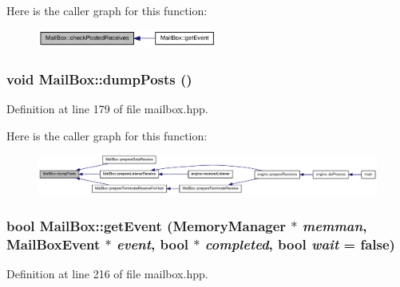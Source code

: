 Here is the caller graph for this function:\nopagebreak
\begin{figure}[H]
\begin{center}
\leavevmode
\includegraphics[width=167pt]{class_mail_box_a0dc7cda2ef943be7763bf18494e9422d_icgraph}
\end{center}
\end{figure}
\hypertarget{class_mail_box_a541c1f871502eec356801ed5657f56c3}{
\subsubsection[{dumpPosts}]{\setlength{\rightskip}{0pt plus 5cm}void MailBox::dumpPosts ()}}
\label{class_mail_box_a541c1f871502eec356801ed5657f56c3}


Definition at line 179 of file mailbox.hpp.

Here is the caller graph for this function:\nopagebreak
\begin{figure}[H]
\begin{center}
\leavevmode
\includegraphics[width=420pt]{class_mail_box_a541c1f871502eec356801ed5657f56c3_icgraph}
\end{center}
\end{figure}
\hypertarget{class_mail_box_ad920ff9b804620414e814322462c783b}{
\subsubsection[{getEvent}]{\setlength{\rightskip}{0pt plus 5cm}bool MailBox::getEvent ({\bf MemoryManager} $\ast$ {\em memman}, \/  {\bf MailBoxEvent} $\ast$ {\em event}, \/  bool $\ast$ {\em completed}, \/  bool {\em wait} = {\ttfamily false})}}
\label{class_mail_box_ad920ff9b804620414e814322462c783b}


Definition at line 216 of file mailbox.hpp.

